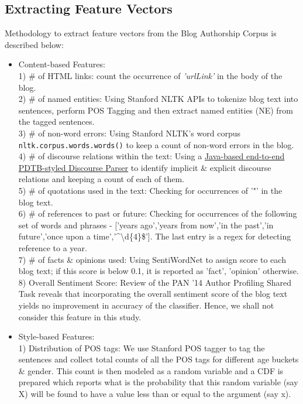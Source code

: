 \documentclass{sig-alternate}
\begin{document}
\subsection{Extracting Feature Vectors}
Methodology to extract feature vectors from the Blog Authorship Corpus is described below:
\begin{itemize}
\item Content-based Features:\\
1) \# of HTML links: count the occurrence of \textit{'urlLink'} in the body of the blog.\\
2) \# of named entities: Using Stanford NLTK APIs to tokenize blog text into sentences, perform POS Tagging and then extract named entities (NE) from the tagged sentences.\\
3) \# of non-word errors: Using Stanford NLTK's word corpus \texttt{nltk.corpus.words.words()} to keep a count of non-word errors in the blog.\\
4) \# of discourse relations within the text: Using a \href{https://github.com/ilija139/PDTB-Parser}{Java-based end-to-end PDTB-styled Discourse Parser} to identify implicit \& explicit discourse relations and keeping a count of each of them.\\
5) \# of quotations used in the text: Checking for occurrences of '"' in the blog text.\\
6) \# of references to past or future: Checking for occurrences of the following set of words and phrases - ['years ago','years from now','in the past','in future','once upon a time','\textasciicircum \textbackslash d\{4\}\$']. The last entry is a regex for detecting reference to a year.\\
7) \# of facts \& opinions used: Using SentiWordNet to assign score to each blog text; if this score is below 0.1, it is reported as 'fact', 'opinion' otherwise.\\
8) Overall Sentiment Score: Review of the PAN '14 Author Profiling Shared Task reveals that incorporating the overall sentiment score of the blog text yields no improvement in accuracy of the classifier. Hence, we shall not consider this feature in this study.
\item Style-based Features:\\
1) Distribution of POS tags: We use Stanford POS tagger to tag the sentences and collect total counts of all the POS tags for different age buckets \& gender. This count is then modeled as a random variable and a CDF is prepared which reports what is the probability that this random variable (say X) will be found to have a value less than or equal to the argument (say x).

\end{itemize}
\end{document}
